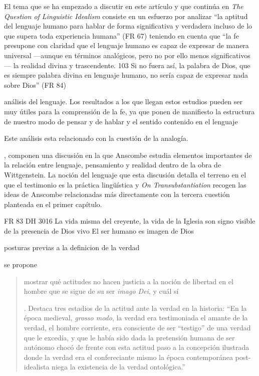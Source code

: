 El tema que se ha empezado a discutir en este artículo y que continúa en \emph{The Question of Linguistic Idealism} consiste en un esfuerzo por analizar \enquote{la aptitud del lenguaje humano para hablar de forma significativa y verdadera incluso de lo que supera toda experiencia humana} (FR 67) teniendo en cuenta que \enquote{la fe presupone con claridad que el lenguaje humano es capaz de expresar de manera universal —aunque en términos analógicos, pero no por ello menos significativos— la realidad divina y trascendente. 103 Si no fuera así, la palabra de Dios, que es siempre palabra divina en lenguaje humano, no sería capaz de expresar nada sobre Dios} (FR 84)

análisis del lenguaje. Los resultados a los que llegan estos estudios pueden ser muy útiles para la comprensión de la fe, ya que ponen de manifiesto la estructura de nuestro modo de pensar y de hablar y el sentido contenido en el lenguaje

Este análisis esta relacionado con la cuestión de la analogía. 

, componen una discusión en la que Anscombe estudia elementos importantes de la relación entre lenguaje, pensamiento y realidad dentro de la obra de Wittgenstein. La noción del lenguaje que esta discusión detalla el terreno en el que el testimonio es la práctica lingüística
y \emph{On Transubstantiation} recogen las ideas de Anscombe relacionadas más directamente con la tercera cuestión planteada en el primer capítulo. 



 
FR 83 DH 3016
La vida misma del creyente, la vida de la Iglesia son signo visible de la presencia de Dios vivo
El ser humano es imagen de Dios

posturas previas a la definicion de la verdad 

se propone
\blockquote[{\Cite[Cf.][354-356]{dominguez2009at}. Destaca tres estadios de la actitud ante la verdad en la historia: \enquote{En la época medieval, \emph{grosso modo}, la verdad era testimoniada \textelp{} el amante de la verdad, el hombre corriente, era consciente de ser ``testigo'' de una verdad que le excedía, y que le había sido dada \textelp{} la pretensión humana de ser autónomo chocó de frente con esta actitud  paso a la concepción ilustrada donde la verdad era el confereciante mismo  la época contemporánea post-idealista niega la existencia de la verdad ontológica.}}]{mostrar qué actitudes no hacen justicia a la noción de libertad en el hombre que se sigue de su ser \emph{imago Dei}, y cuál sí}.


